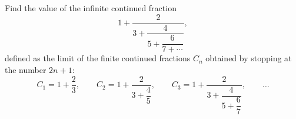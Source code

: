 Find the value of the infinite continued fraction
\[1+\dfrac{2}{3+\dfrac{4}{5+\dfrac{6}{7+\cdots}}},\]
defined as the limit of the finite continued fractions $C_n$ obtained by stopping at the number $2n+1$:
\[C_1=1+\dfrac23,\qquad C_2=1+\dfrac{2}{3+\dfrac45},\qquad C_3=1+\dfrac{2}{3+\dfrac{4}{5+\dfrac67}},\qquad\dots\]
